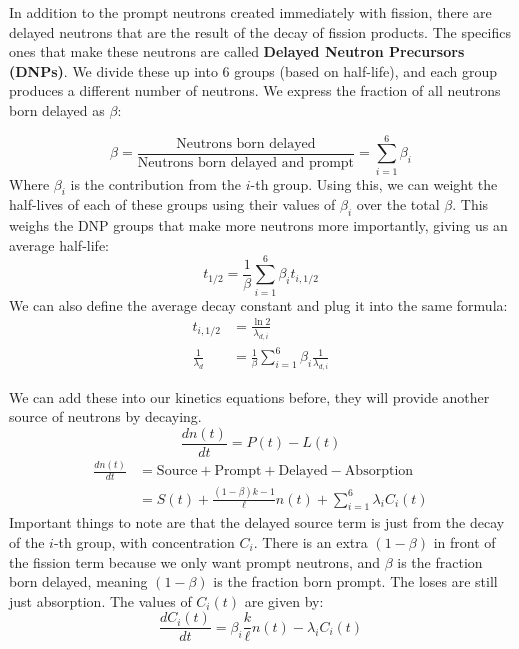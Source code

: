 \documentclass[letter]{article}
\begin{document}
\vspace{10pt}
In addition to the prompt neutrons created immediately with fission,
there are delayed neutrons that are the result of the decay of fission
products. The specifics ones that make these neutrons are called
\textbf{Delayed Neutron Precursors (DNPs)}. We divide these up into 6
groups (based on half-life), and each group produces a different
number of neutrons. We express the fraction of all neutrons born
delayed as $\beta$:

\begin{equation*}
  \beta = \frac{\text{Neutrons born delayed}}{\text{Neutrons born
      delayed and prompt}} = \sum^6_{i=1}\beta_i
\end{equation*}
Where $\beta_i$ is the contribution from the $i$-th group. Using this,
we can weight the half-lives of each of these groups using their
values of $\beta_i$ over the total $\beta$. This weighs the DNP groups
that make more neutrons more importantly, giving us an average half-life:
\begin{equation*}
  t_{1/2}=\frac{1}{\beta}\sum^6_{i=1}\beta_it_{i,1/2}
\end{equation*}
We can also define the average decay constant and plug it into the
same formula:
\begin{equation*}
  \begin{split}
    t_{i,1/2}&=\frac{\ln{2}}{\lambda_{d,i}}\\
    \frac{1}{\lambda_d}&=\frac{1}{\beta}\sum^6_{i=1}\beta_i\frac{1}{\lambda_{d,i}}
  \end{split}
\end{equation*}

We can add these into our kinetics equations before, they will provide
another source of neutrons by decaying.
\begin{equation*}
  \frac{dn(t)}{dt}=P(t)-L(t)
\end{equation*}
\begin{equation*}
  \begin{split}
    \frac{dn(t)}{dt} &= \text{Source} + \text{Prompt} + \text{Delayed}
    - \text{Absorption}\\
    &= S(t) + \frac{(1-\beta)k-1}{\ell}n(t)+\sum^6_{i=1}\lambda_iC_i(t)
  \end{split}
\end{equation*}
Important things to note are that the delayed source term is just from
the decay of the $i$-th group, with concentration $C_i$. There is an
extra $(1-\beta)$ in front of the fission term because we only want
prompt neutrons, and $\beta$ is the fraction born delayed, meaning
$(1-\beta)$ is the fraction born prompt. The loses are still just
absorption. The values of $C_i(t)$ are given by:
\begin{equation*}
  \frac{dC_i(t)}{dt}=\beta_i\frac{k}{\ell}n(t)-\lambda_iC_i(t)
\end{equation*}
\end{document}
